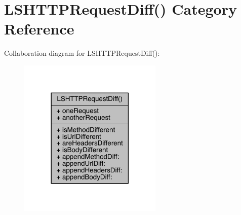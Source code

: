\hypertarget{category_l_s_h_t_t_p_request_diff_07_08}{\section{L\-S\-H\-T\-T\-P\-Request\-Diff() Category Reference}
\label{category_l_s_h_t_t_p_request_diff_07_08}
}


Collaboration diagram for L\-S\-H\-T\-T\-P\-Request\-Diff()\-:\nopagebreak
\begin{figure}[H]
\begin{center}
\leavevmode
\includegraphics[width=194pt]{category_l_s_h_t_t_p_request_diff_07_08__coll__graph}
\end{center}
\end{figure}
